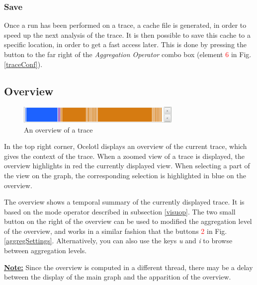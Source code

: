 \documentclass[twoside]{article}
\begin{document}
\begin{sloppypar}
\subsubsection{Save}
Once a run has been performed on a trace, a cache file is generated, in order to speed up the next analysis of the trace. It is then possible to save this cache to a specific location, in order to get a fast access later. This is done by pressing the button to the far right of the \textit{Aggregation Operator} combo box (element \textcolor{red}{6} in Fig. \ref{traceConf}).

\subsection{Overview}
\begin{figure}[h!]
	\centering
	\includegraphics[width=0.7\textwidth]{images/overview.png}
	\caption{An overview of a trace}
	\label{overview}
\end{figure}
In the top right corner, Ocelotl displays an overview of the current trace, which gives the context of the trace. When a zoomed view of a trace is displayed, the overview highlights in red the currently displayed view. When selecting a part of the view on the graph, the corresponding selection is highlighted in blue on the overview.

The overview shows a temporal summary of the currently displayed trace. It is based on the mode operator described in subsection \ref{visuop}. The two small button on the right of the overview can be used to modified the aggregation level of the overview, and works in a similar fashion that the buttons \textcolor{red}{2} in Fig. \ref{aggregSettings}. Alternatively, you can also use the keys \textit{u} and \textit{i} to browse between aggregation levels.

\underline{\textbf{Note:}} Since the overview is computed in a different thread, there may be a delay between the display of the main graph and the apparition of the overview.


\end{sloppypar}
\end{document}

